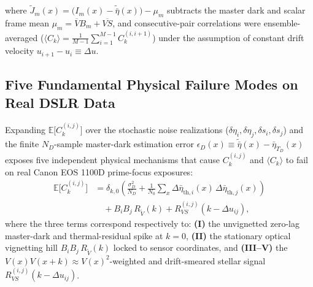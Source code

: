 \documentclass[10pt,twocolumn,letterpaper]{article}
\def\bm#1{#1}%
\begin{document}
where $\tilde{J}_m(\bm{x}) = \big(I_m(\bm{x}) - \tilde{\bar{\eta}}(\bm{x})\big) - \mu_m$ subtracts the master dark and scalar frame mean $\mu_m = \overline{V} B_m + \overline{V S}$, and consecutive-pair correlations were ensemble-averaged ($\langle C_{\bm{k}} \rangle = \frac{1}{M-1} \sum_{i=1}^{M-1} C_{\bm{k}}^{(i, i+1)}$) under the assumption of constant drift velocity $\bm{u}_{i+1} - \bm{u}_i \equiv \Delta\bm{u}$.

\subsection{Five Fundamental Physical Failure Modes on Real DSLR Data}

Expanding $\mathbb{E}\big[C_{\bm{k}}^{(i,j)}\big]$ over the stochastic noise realizations ($\delta\eta_i, \delta\eta_j, \delta s_i, \delta s_j$) and the finite $N_D$-sample master-dark estimation error $\epsilon_D(\bm{x}) \equiv \tilde{\bar{\eta}}(\bm{x}) - \bar{\eta}_{T_D}(\bm{x})$ exposes five independent physical mechanisms that cause $C_{\bm{k}}^{(i,j)}$ and $\langle C_{\bm{k}} \rangle$ to fail on real Canon EOS 1100D prime-focus exposures:
\begin{equation}
  \begin{aligned}
    \mathbb{E}\big[C_{\bm{k}}^{(i,j)}\big]
    &= \delta_{\bm{k},\bm{0}} \left(\frac{\sigma_D^2}{N_D} + \frac{1}{N_{\bm{0}}}\sum_{\bm{x}} \Delta\bar{\eta}_{\text{th},i}(\bm{x})\,\Delta\bar{\eta}_{\text{th},j}(\bm{x})\right) \\
    &\quad + B_i B_j \, R_{\tilde{V}}(\bm{k})
     + R_{VS}^{(i,j)}(\bm{k} - \Delta\bm{u}_{ij}),
  \end{aligned}
  \label{eq:corr_expectation}
\end{equation}
where the three terms correspond respectively to: \textbf{(I)} the unvignetted zero-lag master-dark and thermal-residual spike at $\bm{k} = \bm{0}$, \textbf{(II)} the stationary optical vignetting hill $B_i B_j\, R_{\tilde{V}}(\bm{k})$ locked to sensor coordinates, and \textbf{(III--V)} the $V(\bm{x})V(\bm{x}+\bm{k}) \approx V(\bm{x})^2$-weighted and drift-smeared stellar signal $R_{VS}^{(i,j)}(\bm{k} - \Delta\bm{u}_{ij})$.
\end{document}
